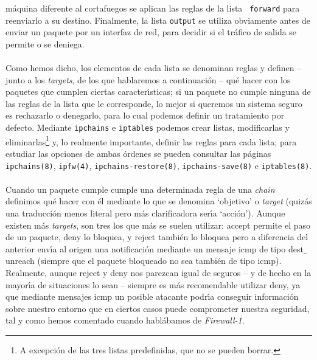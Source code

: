 m\'aquina diferente al cortafuegos se aplican las reglas de la lista {\tt 
forward} para reenviarlo a su destino. Finalmente, la lista {\tt output} se 
utiliza obviamente antes de enviar un paquete por un interfaz de red, para
decidir si el tr\'afico de salida se permite o se deniega.\\ 
\\Como hemos dicho, los elementos de cada lista se denominan reglas y definen 
-- junto a los {\it targets}, de los que hablaremos a continuaci\'on -- qu\'e 
hacer con los paquetes que cumplen ciertas caracter\'{\i}sticas; si un paquete 
no cumple ninguna de las reglas de la lista que le corresponde, lo mejor si 
queremos un sistema seguro es rechazarlo o denegarlo, para lo cual podemos
definir un tratamiento por defecto. Mediante {\tt ipchains} e {\tt iptables} 
podemos crear listas, modificarlas y eliminarlas\footnote{A excepci\'on de las 
tres listas predefinidas, que no se pueden borrar.} y, lo realmente importante, 
definir las reglas para cada lista; para estudiar las opciones de ambas 
\'ordenes se pueden consultar las p\'aginas {\tt ipchains(8)}, {\tt ipfw(4)}, 
{\tt ipchains-restore(8)}, {\tt ipchains-save(8)} e {\tt iptables(8)}.\\
\\Cuando un paquete cumple cumple una determinada regla de una {\it chain} 
definimos qu\'e hacer con \'el mediante lo que se denomina 
`objetivo' o {\it target} (quiz\'as una traducci\'on menos literal pero m\'as
clarificadora ser\'{\i}a `acci\'on'). Aunque existen m\'as {\it targets}, son
tres los que m\'as se suelen utilizar: {\sc accept} permite el paso de un 
paquete, {\sc deny} lo bloquea, y {\sc reject} tambi\'en lo bloquea pero a 
diferencia del anterior env\'{\i}a al origen una notificaci\'on mediante un
mensaje {\sc icmp} de tipo {\sc dest$\_$unreach} (siempre que el paquete 
bloqueado no sea tambi\'en de tipo {\sc icmp}). Realmente, aunque {\sc reject}
y {\sc deny} nos parezcan igual de seguros -- y de hecho en la mayor\'{\i}a de
situaciones lo sean -- siempre es m\'as recomendable utilizar {\sc deny}, ya
que mediante mensajes {\sc icmp} un posible atacante podr\'{\i}a conseguir
informaci\'on sobre nuestro entorno que en ciertos casos puede comprometer 
nuestra seguridad, tal y como hemos comentado cuando habl\'abamos de {\it
Firewall-1}.
